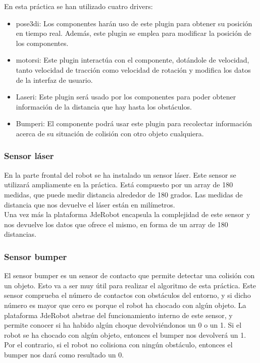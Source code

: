 En esta práctica se han utilizado cuatro drivers: 

\begin{itemize}
\item pose3di: Los componentes harán uso de este plugin para obtener su posición en tiempo real. Además, este plugin se emplea para modificar la posición de los componentes.
\item motorsi: Este plugin interactúa con el componente, dotándole de velocidad, tanto velocidad de tracción como velocidad de rotación y modifica los datos de la interfaz de usuario.
\item Laseri: Este plugin será usado por los componentes para poder obtener información de la distancia que hay hasta los obstáculos.
\item Bumperi: El componente podrá usar este plugin para recolectar información acerca de su situación de colisión con otro objeto cualquiera.
\end{itemize}

\subsubsection{Sensor láser}
En la parte frontal del robot se ha instalado un sensor láser. Este sensor se utilizará ampliamente en la práctica. Está compuesto por un array de 180 medidas, que puede medir distancia alrededor de 180 grados. Las medidas de distancia que nos devuelve el láser están en milímetros.\\

Una vez más la plataforma JdeRobot encapsula la complejidad de este sensor y nos devuelve los datos que ofrece el mismo, en forma de un array de 180 distancias.

\subsubsection{Sensor bumper}
El sensor bumper es un sensor de contacto que permite detectar una colisión con un objeto. Esto va a ser muy útil para realizar el algoritmo de esta práctica. Este sensor comprueba el número de contactos con obstáculos del entorno, y si dicho número es mayor que cero es porque el robot ha chocado con algún objeto. La plataforma JdeRobot abstrae del funcionamiento interno de este sensor, y permite conocer si ha habido algún choque devolviéndonos un 0 o un 1. Si el robot se ha chocado con algún objeto, entonces el bumper nos devolverá un 1. Por el contrario, si el robot no colisiona con ningún obstáculo, entonces el bumper nos dará como resultado un 0.



